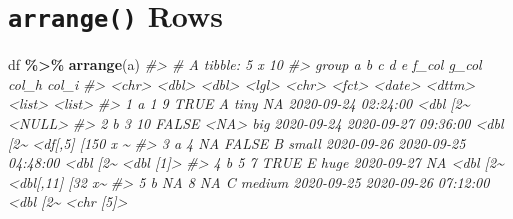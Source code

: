 \documentclass[
]{report}
\newenvironment{Shaded}{\begin{snugshade}}{\end{snugshade}}
\newcommand{\CommentTok}[1]{\textcolor[rgb]{0.56,0.35,0.01}{\textit{#1}}}
\newcommand{\KeywordTok}[1]{\textcolor[rgb]{0.13,0.29,0.53}{\textbf{#1}}}
\newcommand{\NormalTok}[1]{#1}
\newcommand{\OperatorTok}[1]{\textcolor[rgb]{0.81,0.36,0.00}{\textbf{#1}}}
\newcommand{\StringTok}[1]{\textcolor[rgb]{0.31,0.60,0.02}{#1}}
\begin{document}
\hypertarget{arrange-rows}{%
\section{\texorpdfstring{\texttt{arrange()} Rows}{arrange() Rows}}\label{arrange-rows}}

\begin{Shaded}
\begin{Highlighting}[]
\NormalTok{df }\OperatorTok{\%\textgreater{}\%}
\StringTok{  }\KeywordTok{arrange}\NormalTok{(a)}
\CommentTok{\#\textgreater{} \# A tibble: 5 x 10}
\CommentTok{\#\textgreater{}   group     a     b c     d     e      f\_col      g\_col               col\_h    col\_i           }
\CommentTok{\#\textgreater{}   \textless{}chr\textgreater{} \textless{}dbl\textgreater{} \textless{}dbl\textgreater{} \textless{}lgl\textgreater{} \textless{}chr\textgreater{} \textless{}fct\textgreater{}  \textless{}date\textgreater{}     \textless{}dttm\textgreater{}              \textless{}list\textgreater{}   \textless{}list\textgreater{}          }
\CommentTok{\#\textgreater{} 1 a         1     9 TRUE  A     tiny   NA         2020{-}09{-}24 02:24:00 \textless{}dbl [2\textasciitilde{} \textless{}NULL\textgreater{}          }
\CommentTok{\#\textgreater{} 2 b         3    10 FALSE \textless{}NA\textgreater{}  big    2020{-}09{-}24 2020{-}09{-}27 09:36:00 \textless{}dbl [2\textasciitilde{} \textless{}df[,5] [150 x \textasciitilde{}}
\CommentTok{\#\textgreater{} 3 a         4    NA FALSE B     small  2020{-}09{-}26 2020{-}09{-}25 04:48:00 \textless{}dbl [2\textasciitilde{} \textless{}dbl [1]\textgreater{}       }
\CommentTok{\#\textgreater{} 4 b         5     7 TRUE  E     huge   2020{-}09{-}27 NA                  \textless{}dbl [2\textasciitilde{} \textless{}dbl[,11] [32 x\textasciitilde{}}
\CommentTok{\#\textgreater{} 5 b        NA     8 NA    C     medium 2020{-}09{-}25 2020{-}09{-}26 07:12:00 \textless{}dbl [2\textasciitilde{} \textless{}chr [5]\textgreater{}}
\end{Highlighting}
\end{Shaded}
\end{document}
